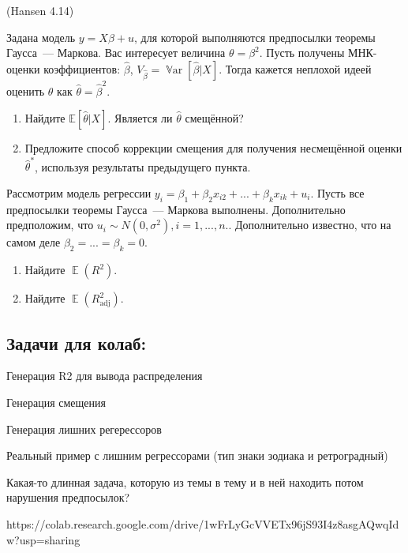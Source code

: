 \documentclass[12pt]{article}
\DeclareMathOperator{\Var}{\mathbb{V}ar}
\DeclareMathOperator{\E}{\mathbb{E}}
\newcommand{\hb}{\hat{\beta}}
\renewcommand{\u}{u}
\newcommand{\adj}{\text{adj}}
\begin{document}
\begin{problem}(Hansen 4.14)

Задана модель $y = X \beta + u$, для которой выполняются предпосылки теоремы Гаусса~--- Маркова. Вас интересует величина $\theta = \beta^2$. Пусть получены МНК-оценки коэффициентов: $\hb$, $V_{\hb} = \Var [\hb | X]$. Тогда кажется неплохой идеей оценить $\theta$ как $\hat{\theta} = \hb^2$.

\begin{enumerate}
    \item Найдите $\mathbb{E} [\hat{\theta} | X]$. Является ли $\hat{\theta}$ смещённой?
    
    \item Предложите способ коррекции смещения для получения несмещённой оценки  $\hat{\theta}^*$, используя результаты предыдущего пункта.
\end{enumerate}

\end{problem}

\begin{problem}
Рассмотрим модель регрессии $y_i = \beta_1 + \beta_2x_{i2} + ... +\beta_kx_{ik} + \u_i$. Пусть все предпосылки теоремы Гаусса~--- Маркова выполнены. Дополнительно предположим, что $\u_i \sim N(0,\sigma^2), i=1,...,n.$. Дополнительно известно, что на самом деле $\beta_2 = ... = \beta_k = 0$.
\begin{enumerate}
\item Найдите $\E(R^2)$.
\item Найдите $\E(R^2_{\adj})$.
\end{enumerate}
\end{problem}

\subsection{Задачи для колаб:}

Генерация R2 для вывода распределения

Генерация смещения

Генерация лишних регерессоров

Реальный пример с лишним регрессорами (тип знаки зодиака и ретроградный)

Какая-то длинная задача, которую из темы в тему и в ней находить потом нарушения предпосылок?



https://colab.research.google.com/drive/1wFrLyGcVVETx96jS93I4z8asgAQwqIdw?usp=sharing
\end{document}
